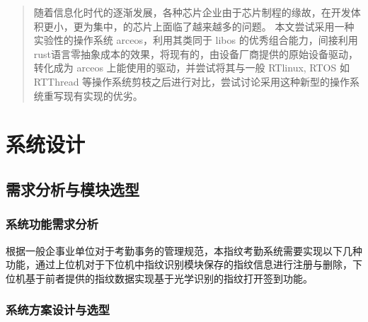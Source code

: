 \documentclass[UTF8,AutoFakeBold=1,AutoFakeSlant,zihao=-4]{cucugthesis}
\begin{document}
\coverpage

\begin{abstract}
    \fontsize{15}{20}\selectfont
    随着信息化时代的逐渐发展，各种芯片企业由于芯片制程的缘故，在开发体积更小，更为集中，的芯片上面临了越来越多的问题。
    本文尝试采用一种实验性的操作系统 arceos，利用其类同于 libos
    的优秀组合能力，间接利用rust语言零抽象成本的效果，将现有的，由设备厂商提供的原始设备驱动，转化成为 arceos 上能使用的驱动，并尝试将其与一般 RTlinux, RTOS 如 RTThread 等操作系统剪枝之后进行对比，尝试讨论采用这种新型的操作系统重写现有实现的优劣。
\end{abstract}


\contentpage

\section{系统设计}

\subsection{需求分析与模块选型}

\subsubsection{系统功能需求分析}

根据一般企事业单位对于考勤事务的管理规范，本指纹考勤系统需要实现以下几种功能，通过上位机对于下位机中指纹识别模块保存的指纹信息进行注册与删除，下位机基于前者提供的指纹数据实现基于光学识别的指纹打开签到功能。

\subsubsection{系统方案设计与选型}
\end{document}
